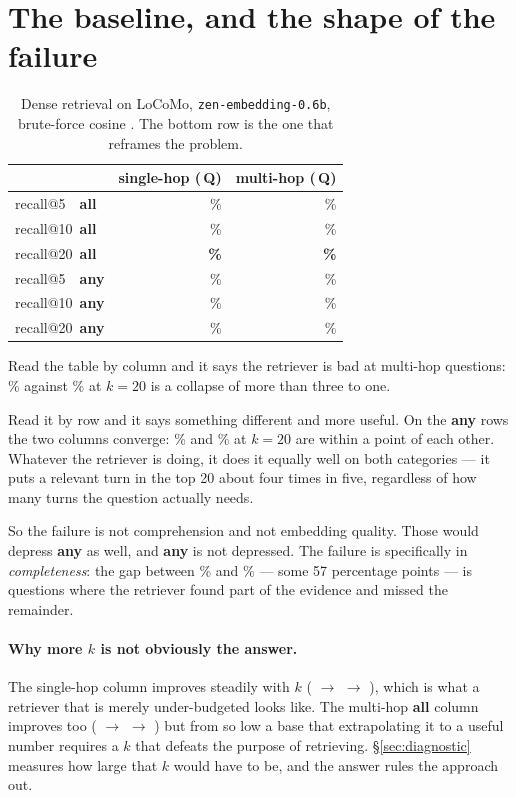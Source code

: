 \section{The baseline, and the shape of the failure}
\label{sec:baseline}

\begin{table}[h]
\centering
\begin{tabular}{lrr}
\toprule
& \textbf{single-hop (\rQsingle{}\,Q)} & \textbf{multi-hop (\rQmulti{}\,Q)} \\
\midrule
recall@5\ \ \textbf{all}   & \rSallFive{}\%   & \rMallFive{}\% \\
recall@10\ \textbf{all}    & \rSallTen{}\%    & \rMallTen{}\% \\
recall@20\ \textbf{all}    & \textbf{\rSallTwenty{}\%} & \textbf{\rMallTwenty{}\%} \\
\midrule
recall@5\ \ \textbf{any}   & \rSanyFive{}\%   & \rManyFive{}\% \\
recall@10\ \textbf{any}    & \rSanyTen{}\%    & \rManyTen{}\% \\
recall@20\ \textbf{any}    & \rSanyTwenty{}\% & \rManyTwenty{}\% \\
\bottomrule
\end{tabular}
\caption{Dense retrieval on LoCoMo, \texttt{zen-embedding-0.6b}, brute-force
cosine \meas{}. The bottom row is the one that reframes the problem.}
\label{tab:baseline}
\end{table}

Read the table by column and it says the retriever is bad at multi-hop
questions: \rSallTwenty{}\% against \rMallTwenty{}\% at $k{=}20$ is a collapse of
more than three to one.

Read it by row and it says something different and more useful. On the
\textbf{any} rows the two columns converge: \rSanyTwenty{}\% and
\rManyTwenty{}\% at $k{=}20$ are within a point of each other. Whatever the
retriever is doing, it does it equally well on both categories --- it puts a
relevant turn in the top 20 about four times in five, regardless of how many
turns the question actually needs.

So the failure is not comprehension and not embedding quality. Those would
depress \textbf{any} as well, and \textbf{any} is not depressed. The failure is
specifically in \emph{completeness}: the gap between \rManyTwenty{}\% and
\rMallTwenty{}\% --- some 57 percentage points --- is questions where the
retriever found part of the evidence and missed the remainder.

\paragraph{Why more $k$ is not obviously the answer.}
The single-hop column improves steadily with $k$ (\rSallFive{} $\to$
\rSallTen{} $\to$ \rSallTwenty{}), which is what a retriever that is
merely under-budgeted looks like. The multi-hop \textbf{all} column improves too
(\rMallFive{} $\to$ \rMallTen{} $\to$ \rMallTwenty{}) but from so low a base that
extrapolating it to a useful number requires a $k$ that defeats the purpose of
retrieving. \S\ref{sec:diagnostic} measures how large that $k$ would have to be,
and the answer rules the approach out.
